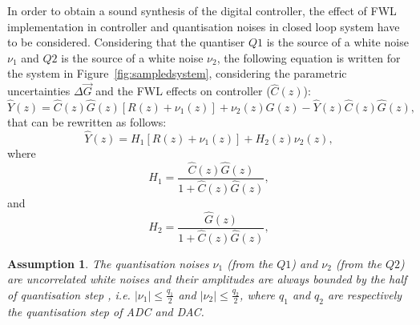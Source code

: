 \documentclass{sig-alternate-05-2015}
\newtheorem{myassumption}{Assumption}
\begin{document}
In order to obtain a sound synthesis of the digital controller, the effect
of FWL implementation in controller and quantisation noises in closed loop
system have to be considered.  Considering that the quantiser $Q1$ is the
source of a white noise $\nu_{1}$ and $Q2$ is the source of a white noise
$\nu_{2}$, the following equation is written for the system in
Figure~\ref{fig:sampledsystem}, considering the parametric uncertainties
$\Delta \vec{G}$ and the FWL effects on controller ($\hat{C}(z)$):
%
\begin{equation}
\hat{Y}(z)=\hat{C}(z)\hat{G}(z)[R(z)+\nu_{1}(z)]+\nu_{2}(z)\hat{G}(z)-\hat{Y}(z)\hat{C}(z)\hat{G}(z),
\end{equation}
%
that can be rewritten as follows:
%
\begin{equation}
\label{eq:outputfunctions}
\hat{Y}(z)=H_{1}[R(z)+\nu_{1}(z)]+H_{2}(z)\nu_{2}(z),
\end{equation}
%
where
%
\begin{equation}
H_{1}=\frac{\hat{C}(z)\hat{G}(z)}{1+\hat{C}(z)\hat{G}(z)},
\end{equation}
%
and
%
\begin{equation}
H_{2}=\frac{\hat{G}(z)}{1+\hat{C}(z)\hat{G}(z)},
\end{equation}

\begin{myassumption}
\label{whitenoise}
%
The quantisation noises $\nu_{1}$ (from the $Q1$) and $\nu_{2}$ (from the
$Q2$) are uncorrelated white noises and their amplitudes are always bounded by the half of quantisation step \cite{astrom1997computer}, {\it i.e.} $\vert \nu_{1} \vert \leq \frac{q_{1}}{2}$ and $\vert \nu_{2} \vert \leq \frac{q_{2}}{2}$, where $q_{1}$ and $q_{2}$ are respectively the quantisation step of  ADC and DAC.
% 
\end{myassumption}
\end{document}
